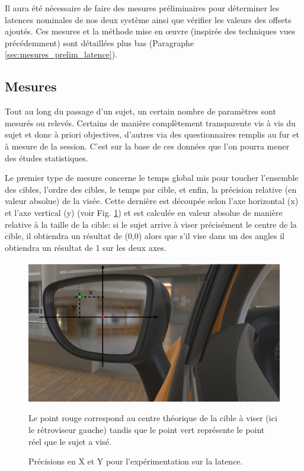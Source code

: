 	\par Il aura été nécessaire de faire des mesures préliminaires pour déterminer les latences nominales de nos deux système ainsi que vérifier les valeurs des offsets ajoutés. Ces mesures et la méthode mise en œuvre (inspirée des techniques vues précédemment) sont détaillées plus bas (Paragraphe \ref{sec:mesures_prelim_latence}).
	
	\subsection{Mesures}
	\par Tout au long du passage d'un sujet, un certain nombre de paramètres sont mesurés ou relevés. Certains de manière complètement transparente vis à vis du sujet et donc à priori objectives, d'autres via des questionnaires remplis au fur et à mesure de la session. C'est sur la base de ces données que l'on pourra mener des études statistiques.
	
	\par Le premier type de mesure concerne le temps global mis pour toucher l'ensemble des cibles, l'ordre des cibles, le temps par cible, et enfin, la précision relative (en valeur absolue) de la visée. Cette dernière est découpée selon l'axe horizontal (x) et l'axe vertical (y) (voir Fig. \ref{fig:x_y_precision_latency}) et est calculée en valeur absolue de manière relative à la taille de la cible: si le sujet arrive à viser précisément le centre de la cible, il obtiendra un résultat de (0,0) alors que s'il vise dans un des angles il obtiendra un résultat de 1 sur les deux axes.
	
	\begin{figure}[h]
		\centering
		\includegraphics[scale=.65]{Figures/XYPrecision}
		\caption{Précisions en X et Y pour l'expérimentation sur la latence.}{Le point rouge correspond au centre théorique de la cible à viser (ici le rétroviseur gauche) tandis que le point vert représente le point réel que le sujet a visé.}
		\label{fig:x_y_precision_latency}
	\end{figure}
	
